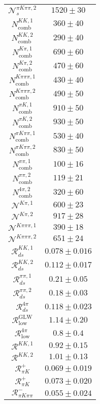 \begin{table}
\begin{tabular}{cc}
$\mathcal{N}_s^{\pi K\pi\pi,2}$ & $1520 \pm 30$ \\
$N_\mathrm{comb}^{KK,1}$ & $360 \pm 40$ \\
$N_\mathrm{comb}^{KK,2}$ & $290 \pm 40$ \\
$N_\mathrm{comb}^{K\pi,1}$ & $690 \pm 60$ \\
$N_\mathrm{comb}^{K\pi,2}$ & $470 \pm 60$ \\
$N_\mathrm{comb}^{K\pi\pi\pi,1}$ & $430 \pm 40$ \\
$N_\mathrm{comb}^{K\pi\pi\pi,2}$ & $490 \pm 50$ \\
$N_\mathrm{comb}^{\pi K,1}$ & $910 \pm 50$ \\
$N_\mathrm{comb}^{\pi K,2}$ & $930 \pm 50$ \\
$N_\mathrm{comb}^{\pi K\pi\pi,1}$ & $530 \pm 40$ \\
$N_\mathrm{comb}^{\pi K\pi\pi,2}$ & $830 \pm 50$ \\
$N_\mathrm{comb}^{\pi\pi,1}$ & $100 \pm 16$ \\
$N_\mathrm{comb}^{\pi\pi,2}$ & $119 \pm 21$ \\
$N_\mathrm{comb}^{4\pi,2}$ & $320 \pm 60$ \\
$\mathcal{N}^{K\pi,1}$ & $600 \pm 23$ \\
$\mathcal{N}^{K\pi,2}$ & $917 \pm 28$ \\
$\mathcal{N}^{K\pi\pi\pi,1}$ & $390 \pm 18$ \\
$\mathcal{N}^{K\pi\pi\pi,2}$ & $651 \pm 24$ \\
$\mathcal{R}_{ds}^{KK,1}$ & $0.078 \pm 0.016$ \\
$\mathcal{R}_{ds}^{KK,2}$ & $0.112 \pm 0.017$ \\
$\mathcal{R}_{ds}^{\pi\pi,1}$ & $0.21 \pm 0.05$ \\
$\mathcal{R}_{ds}^{\pi\pi,2}$ & $0.18 \pm 0.03$ \\
$\mathcal{R}_{ds}^{4\pi}$ & $0.118 \pm 0.023$ \\
$\mathcal{R}_\mathrm{low}^\mathrm{GLW}$ & $1.14 \pm 0.20$ \\
$\mathcal{R}_\mathrm{low}^{4\pi}$ & $0.8 \pm 0.4$ \\
$\mathcal{R}^{KK,1}$ & $0.92 \pm 0.15$ \\
$\mathcal{R}^{KK,2}$ & $1.01 \pm 0.13$ \\
$\mathcal{R}_{\pi K}^+$ & $0.069 \pm 0.019$ \\
$\mathcal{R}_{\pi K}^+$ & $0.073 \pm 0.020$ \\
$\mathcal{R}_{\pi K\pi\pi}^-$ & $0.055 \pm 0.024$ \\

\end{tabular}
\end{table}
